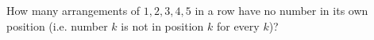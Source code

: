 How many arrangements of $1,2,3,4,5$ in a row have no number in its own position (i.e. number $k$ is not in position $k$ for every $k$)?
